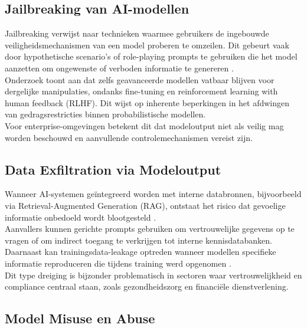 
\subsection{Jailbreaking van AI-modellen}

Jailbreaking verwijst naar technieken waarmee gebruikers de ingebouwde veiligheidsmechanismen van een model proberen te omzeilen. Dit gebeurt vaak door hypothetische scenario’s of role-playing prompts te gebruiken die het model aanzetten om ongewenste of verboden informatie te genereren \autocite{zou2023jailbreak}.\\

Onderzoek toont aan dat zelfs geavanceerde modellen vatbaar blijven voor dergelijke manipulaties, ondanks fine-tuning en reinforcement learning with human feedback (RLHF). Dit wijst op inherente beperkingen in het afdwingen van gedragsrestricties binnen probabilistische modellen.\\

Voor enterprise-omgevingen betekent dit dat modeloutput niet als veilig mag worden beschouwd en aanvullende controlemechanismen vereist zijn.

\subsection{Data Exfiltration via Modeloutput}

Wanneer AI-systemen geïntegreerd worden met interne databronnen, bijvoorbeeld via Retrieval-Augmented Generation (RAG), ontstaat het risico dat gevoelige informatie onbedoeld wordt blootgesteld \autocite{lewis2020rag}.\\

Aanvallers kunnen gerichte prompts gebruiken om vertrouwelijke gegevens op te vragen of om indirect toegang te verkrijgen tot interne kennisdatabanken. Daarnaast kan trainingsdata-leakage optreden wanneer modellen specifieke informatie reproduceren die tijdens training werd opgenomen \autocite{carlini2021extracting}.\\

Dit type dreiging is bijzonder problematisch in sectoren waar vertrouwelijkheid en compliance centraal staan, zoals gezondheidszorg en financiële dienstverlening.

\subsection{Model Misuse en Abuse}

